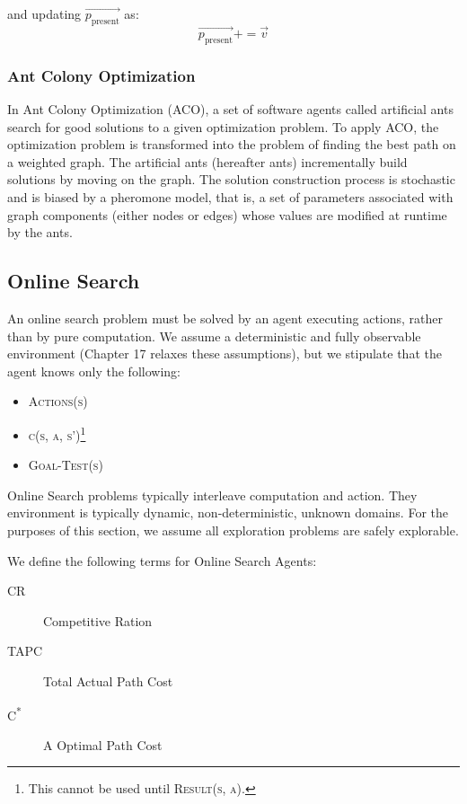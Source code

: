 \noindent and updating $\overrightarrow{p_\text{present}}$ as:
\begin{equation*}
    \overrightarrow{p_\text{present}} += \overrightarrow{v}
\end{equation*}

\subsubsection{Ant Colony Optimization}
In Ant Colony Optimization (ACO), a set of software agents called artificial ants search for good solutions to a given optimization problem. To apply ACO, the optimization problem is transformed into the problem of finding the best path on a weighted graph. The artificial ants (hereafter ants) incrementally build solutions by moving on the graph. The solution construction process is stochastic and is biased by a pheromone model, that is, a set of parameters associated with graph components (either nodes or edges) whose values are modified at runtime by the ants.

\subsection{Online Search}
An online search problem must be solved by an agent executing actions, rather than by pure computation. We assume a deterministic and fully observable environment (Chapter 17 relaxes these assumptions), but we stipulate that the agent knows only the following:

\begin{itemize}
    \item \textsc{Actions(s)}
    \item \textsc{c(s, a, s')}\footnote{This cannot be used until \textsc{Result(s, a)}.}
    \item \textsc{Goal-Test(s)}
\end{itemize}

Online Search problems typically interleave computation and action. They environment is typically dynamic, non-deterministic, unknown domains. For the purposes of this section, we assume all exploration problems are safely explorable.

We define the following terms for Online Search Agents:

\begin{description}
    \item[CR] Competitive Ration
    \item[TAPC] Total Actual Path Cost
    \item[C\textsuperscript{*}]A Optimal Path Cost
\end{description}

